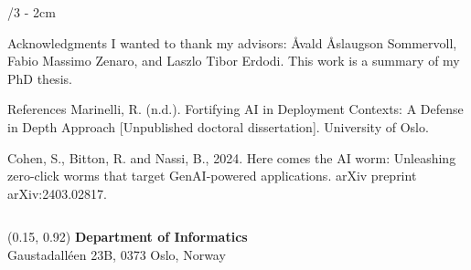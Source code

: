 \documentclass[portrait]{uioposter}
\begin{document}
\begin{frame}
\begin{columns}[onlytextwidth]
\begin{column}{\textwidth/3 - 2cm}
    \begin{block}{Acknowledgments}
       I wanted to thank my advisors: \r{A}vald \r{A}slaugson Sommervoll, Fabio Massimo Zenaro, and Laszlo Tibor Erdodi. This work is a summary of my PhD thesis. 
    \end{block}

    \begin{block}{References}
        Marinelli, R. (n.d.). Fortifying AI in Deployment Contexts: A Defense in Depth Approach [Unpublished doctoral dissertation]. University of Oslo.
        
       Cohen, S., Bitton, R. and Nassi, B., 2024. Here comes the AI worm: Unleashing zero-click worms that target GenAI-powered applications. arXiv preprint arXiv:2403.02817.

       
    \end{block}
\end{column}


\end{columns}


\begin{textblock}{0.5}(0.15, 0.92)
    \color{white}
    \sffamily
    \textbf{Department of Informatics}
    \\
    Gaustadalléen 23B, 0373 Oslo, Norway
\end{textblock}


\end{frame}
\end{document}
